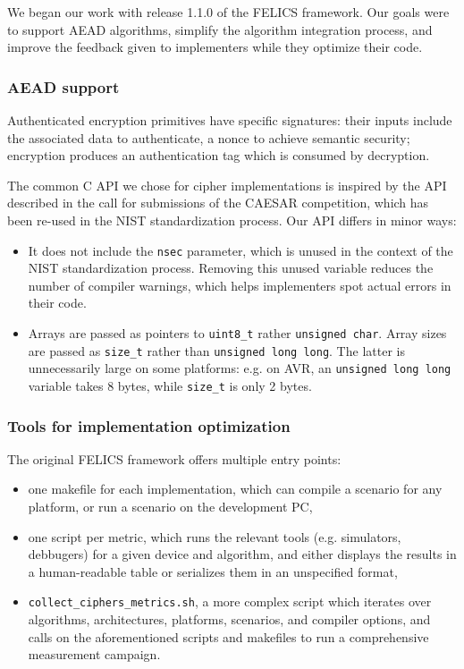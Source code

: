 \documentclass{article}
\begin{document}
We began our work with release 1.1.0 of the FELICS framework.  Our
goals were to support AEAD algorithms, simplify the algorithm
integration process, and improve the feedback given to implementers
while they optimize their code.

\subsubsection{AEAD support}
\label{sec:felics-ae/aead-support}

Authenticated encryption primitives have specific signatures: their
inputs include the associated data to authenticate, a nonce to achieve
semantic security\cite{Rogaway:AEAD}; encryption produces an
authentication tag which is consumed by decryption.

The common C API we chose for cipher implementations is inspired by
the API described in the call for submissions of the CAESAR
competition\cite{CAESAR:call}, which has been re-used in the NIST
standardization process\cite{NIST:LWC-requirements}.  Our API differs
in minor ways:

\begin{itemize}
\item It does not include the \texttt{nsec} parameter, which is unused
  in the context of the NIST standardization process.  Removing this
  unused variable reduces the number of compiler warnings, which helps
  implementers spot actual errors in their code.
\item Arrays are passed as pointers to \texttt{uint8\_t} rather
  \texttt{unsigned char}.  Array sizes are passed as \texttt{size\_t}
  rather than \texttt{unsigned long long}.  The latter is
  unnecessarily large on some platforms: e.g. on AVR, an
  \texttt{unsigned long long} variable takes 8 bytes, while
  \texttt{size\_t} is only 2 bytes.
\end{itemize}

\subsubsection{Tools for implementation optimization}
\label{sec:felics-ae/tools-opt}

The original FELICS framework offers multiple entry points:

\begin{itemize}
\item one makefile for each implementation, which can compile a
  scenario for any platform, or run a scenario on the development PC,
\item one script per metric, which runs the relevant tools
  (e.g. simulators, debbugers) for a given device and algorithm, and
  either displays the results in a human-readable table or serializes
  them in an unspecified format,
\item \texttt{collect\_ciphers\_metrics.sh}, a more complex script
  which iterates over algorithms, architectures, platforms, scenarios,
  and compiler options, and calls on the aforementioned scripts and
  makefiles to run a comprehensive measurement campaign.
\end{itemize}
\end{document}

